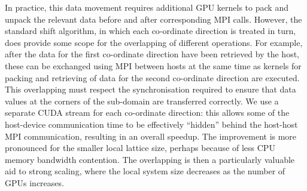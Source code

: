 

In practice, this data movement requires additional GPU kernels to
pack and unpack the relevant data before and after corresponding MPI
calls. However, the standard shift algorithm, in which each co-ordinate
direction is treated in turn, does provide some scope for the
overlapping of different operations.
For example, after the data for the first co-ordinate direction have been
retrieved by the host, these can be exchanged using MPI between
hosts at the same time as kernels for packing and retrieving of
data for the second co-ordinate direction are
executed. This
overlapping must respect the synchronisation required to ensure
that data values at the corners of the sub-domain are transferred
correctly.
We use a separate CUDA stream for each co-ordinate direction:
this allows some of the host-device communication time to be
effectively ``hidden'' behind the host-host MPI communication,
resulting in an overall speedup.
The improvement is more pronounced for the smaller local lattice size,
perhaps because of less CPU memory bandwidth contention. The
overlapping is then a particularly valuable aid to strong scaling,
where the local system size decreases as the number of GPUs increases.


